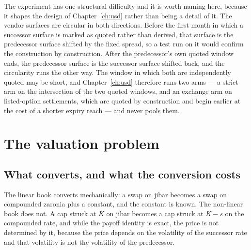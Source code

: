 \documentclass[../../../main.tex]{subfiles}
\begin{document}
The experiment has one structural difficulty and it is worth naming here, because it shapes the design of Chapter~\ref{ch:usd} rather than being a detail of it. The vendor surfaces are circular in both directions. Before the first month in which a successor surface is marked as quoted rather than derived, that surface is the predecessor surface shifted by the fixed spread, so a test run on it would confirm the construction by construction. After the predecessor's own quoted window ends, the predecessor surface is the successor surface shifted back, and the circularity runs the other way. The window in which both are independently quoted may be short, and Chapter~\ref{ch:usd} therefore runs two arms --- a strict arm on the intersection of the two quoted windows, and an exchange arm on listed-option settlements, which are quoted by construction and begin earlier at the cost of a shorter expiry reach --- and never pools them.


\section{The valuation problem}\label{sec:intro-valuation}

\subsection{What converts, and what the conversion costs}

The linear book converts mechanically: a swap on \gls{jibar} becomes a swap on compounded \gls{zaronia} plus a constant, and the constant is known. The non-linear book does not. A cap struck at $K$ on \gls{jibar} becomes a cap struck at $K-s$ on the compounded rate, and while the payoff identity is exact, the price is not determined by it, because the price depends on the volatility of the successor rate and that volatility is not the volatility of the predecessor.
\end{document}
